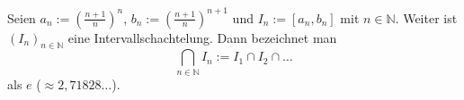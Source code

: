 Seien $a_n := (\frac{n+1}{n})^n$, $b_n := (\frac{n+1}{n})^{n+1}$ und $I_n := [a_n, b_n]$ mit $n \in \mathbb{N}$. Weiter ist $(I_n)_{n \in \mathbb{N}}$ eine Intervallschachtelung. Dann bezeichnet man
$$\bigcap_{n \in \mathbb{N}} I_n := I_1 \cap I_2 \cap \dots$$
als  $e$ ($\approx 2,71828 \dots$).